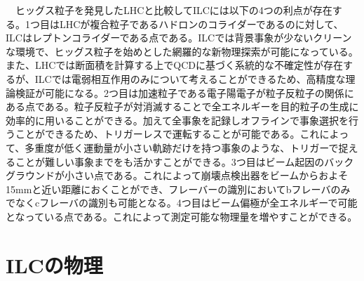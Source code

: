 　ヒッグス粒子を発見したLHCと比較してILCには以下の4つの利点が存在する。1つ目はLHCが複合粒子であるハドロンのコライダーであるのに対して、ILCはレプトンコライダーである点である。ILCでは背景事象が少ないクリーンな環境で、ヒッグス粒子を始めとした網羅的な新物理探索が可能になっている。また、LHCでは断面積を計算する上でQCDに基づく系統的な不確定性が存在するが、ILCでは電弱相互作用のみについて考えることができるため、高精度な理論検証が可能になる。2つ目は加速粒子である電子陽電子が粒子反粒子の関係にある点である。粒子反粒子が対消滅することで全エネルギーを目的粒子の生成に効率的に用いることができる。加えて全事象を記録しオフラインで事象選択を行うことができるため、トリガーレスで運転することが可能である。これによって、多重度が低く運動量が小さい軌跡だけを持つ事象のような、トリガーで捉えることが難しい事象までをも活かすことができる。3つ目はビーム起因のバックグラウンドが小さい点である。これによって崩壊点検出器をビームからおよそ15mmと近い距離におくことができ、フレーバーの識別においてbフレーバのみでなくcフレーバの識別も可能となる。4つ目はビーム偏極が全エネルギーで可能となっている点である。これによって測定可能な物理量を増やすことができる。
\section{ILCの物理}

